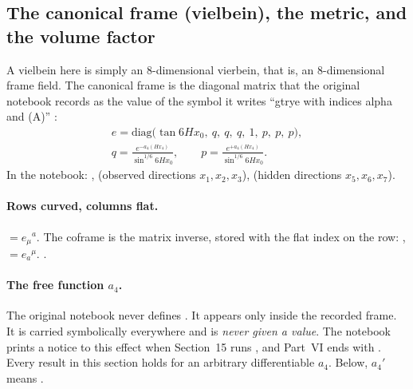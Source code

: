 \subsection{The canonical frame (vielbein), the metric, and the volume factor}
\label{csc:frame}\label{sec:9.3}

A vielbein here is simply an 8-dimensional vierbein, that is, an 8-dimensional frame field. The
canonical frame is the diagonal matrix that the original notebook records as the value of the
symbol it writes ``gtrye with indices alpha and (A)'' :
\begin{gather}
  e=\mathrm{diag}\bigl(\tan 6Hx_0,\ q,\ q,\ q,\ 1,\ p,\ p,\ p\bigr),\\
  q=\frac{e^{-a_4(Hx_4)}}{\sin^{1/6}6Hx_0},\qquad
  p=\frac{e^{+a_4(Hx_4)}}{\sin^{1/6}6Hx_0}.
\end{gather}
In the notebook: ,
 (observed directions $x_1,x_2,x_3$),  (hidden directions
$x_5,x_6,x_7$).

\paragraph{Rows curved, columns flat.}  $=e_\mu{}^a$. The
coframe is the matrix inverse, stored with the flat index on the row:
, 
$=e_a{}^\mu$. 
.

\paragraph{The free function \texorpdfstring{$a_4$}{a4}.} The original notebook never defines
. It appears only inside the recorded frame. It is carried symbolically everywhere and
is \emph{never given a value}. The notebook prints a notice to this effect when Section~15 runs
, and Part~VI ends with 
.
Every result in this section holds for an arbitrary differentiable $a_4$. Below, $a_4'$ means
.

